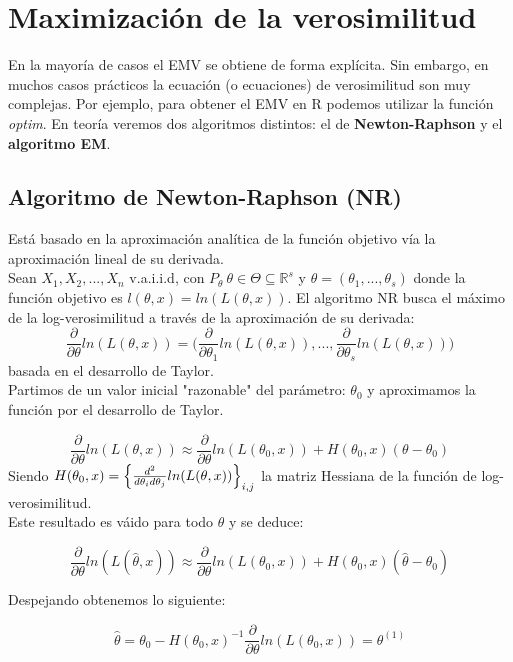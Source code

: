 
\section{Maximización de la verosimilitud}

En la mayoría de casos el EMV se obtiene de forma explícita. Sin embargo, en muchos casos prácticos la ecuación (o ecuaciones) de verosimilitud son muy complejas.
Por ejemplo, para obtener el EMV en R podemos utilizar la función \textit{optim}. En teoría veremos dos algoritmos distintos: el de \textbf{Newton-Raphson} y el \textbf{algoritmo EM}. 

\subsection*{Algoritmo de Newton-Raphson (NR)}

Está basado en la aproximación analítica de la función objetivo vía la aproximación lineal de su derivada. \\

Sean $X_1, X_2,...,X_n$ v.a.i.i.d, con $P_\theta\ \theta\in\Theta\subseteq \mathbb{R}^s$ y $\theta=(\theta_1,...,\theta_s)$ donde la función objetivo es $l(\theta,x)=ln(L(\theta,x))$.
El algoritmo NR busca el máximo de la log-verosimilitud a través de la aproximación de su derivada: 
$$\frac{\partial}{\partial\theta}ln(L(\theta,x))=\Big(\frac{\partial}{\partial\theta_1}ln(L(\theta,x)),...,\frac{\partial}{\partial\theta_s}ln(L(\theta,x))\Big)$$
basada en el desarrollo de Taylor.\\

Partimos de un valor inicial "razonable" del parámetro: $\theta_0$ y aproximamos la función por el desarrollo de Taylor.

$$\frac{\partial}{\partial\theta}ln(L(\theta,x))\approx\frac{\partial}{\partial\theta}ln(L(\theta_0,x))+H(\theta_0,x)(\theta-\theta_0)$$
Siendo $H(\theta_0,x)=\Big{\{}\frac{d^2}{d\theta_i d\theta_j}ln(L(\theta,x))\Big{\}}_{i,j}$ la matriz Hessiana de la función de log-verosimilitud. \\

Este resultado es váido para todo $\theta$ y se deduce:

$$\frac{\partial}{\partial\theta}ln(L(\hat\theta,x))\approx\frac{\partial}{\partial\theta}ln(L(\theta_0,x))+H(\theta_0,x)(\hat\theta-\theta_0)$$

Despejando obtenemos lo siguiente:

$$\hat\theta=\theta_0-H(\theta_0,x)^{-1}\frac{\partial}{\partial\theta}ln(L(\theta_0,x))=\theta^{(1)}$$

